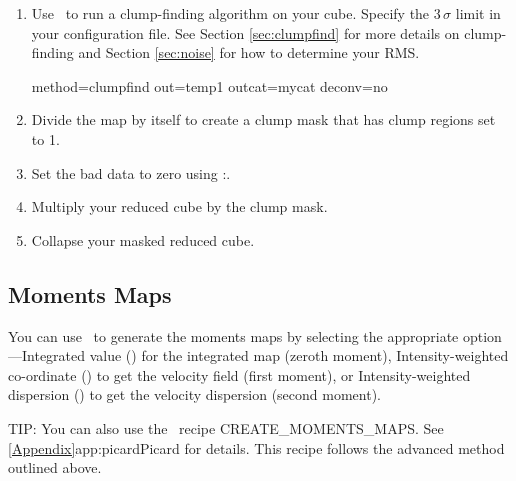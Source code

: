 \documentclass[11pt,oneside,chapters]{starlink}
\providecommand{\nomagic}{\xref{\task{nomagic}}{sun95}{NOMAGIC}}
\begin{document}
\begin{enumerate}[label=(\arabic*)]
\item Use \findclumps\ to run a clump-finding algorithm on your cube.
Specify the 3\,$\sigma$ limit in your configuration file. See Section
\ref{sec:clumpfind} for more details on clump-finding and Section
\ref{sec:noise} for how to determine your RMS.
\begin{terminalv}
  method=clumpfind out=temp1 outcat=mycat deconv=no
\end{terminalv}

\item Divide the map by itself to create a clump mask that has clump
regions set to 1.
\begin{terminalv}
\end{terminalv}

\item Set the bad data to zero using \Kappa:\nomagic.
\begin{terminalv}
\end{terminalv}

\item Multiply your reduced cube by the clump mask.
\begin{terminalv}
\end{terminalv}

\item Collapse your masked reduced cube.
\begin{terminalv}
\end{terminalv}
\end{enumerate}

\subsection{Moments Maps}

You can use \collapse\ to generate the moments maps by selecting the
appropriate  option---Integrated value
() for the integrated map (zeroth moment),
Intensity-weighted co-ordinate () to get the velocity field
(first moment), or Intensity-weighted dispersion () to get the
velocity dispersion (second moment).

\begin{tip}
TIP: You can also use the \picard\ recipe CREATE\_MOMENTS\_MAPS. See
\cref{Appendix}{app:picard}{Picard} for details. This recipe follows
the advanced method outlined above.
\end{tip}
\end{document}
